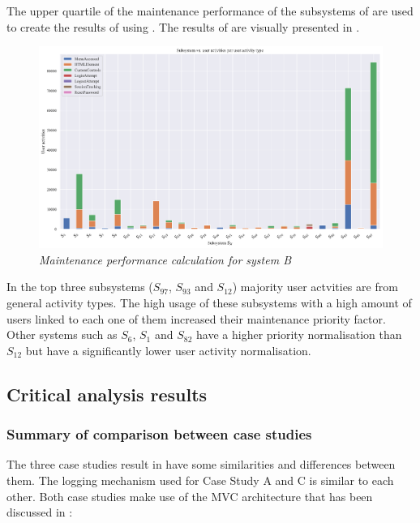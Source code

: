 

The upper quartile of the maintenance performance of the subsystems of  are used to create the results of  using . The results of  are visually presented in .

\clearpage

\begin{figure}[!htb]
	\centering %
	\includegraphics[width=0.95\linewidth]{img/ch3/analysis/case_C_subsystems_1.pdf}
	\caption[Maintenance performance calculation for system B]
	{\textit{Maintenance performance calculation for system B}}\label{fig:ch3_systemCBar}
\end{figure} 

In  the top three subsystems ($S_{97}$, $S_{93}$ and $S_{12}$) majority user actvities are from general activity types. The high usage of these subsystems with a high amount of users linked to each one of them increased their maintenance priority factor. Other systems such as $S_{6}$, $S_{1}$ and $S_{82}$ have a higher priority normalisation than $S_{12}$ but have a significantly lower user activity normalisation. 

\subsection{Critical analysis results}

\subsubsection{Summary of comparison between case studies}
The three case studies result in  have some similarities and differences between them. The logging mechanism used for Case Study A and C is similar to each other. Both case studies make use of the MVC architecture that has been discussed in :

